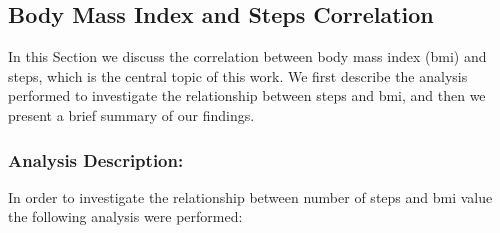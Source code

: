 \documentclass[11pt]{iopart}
\begin{document}
\subsection{Body Mass Index and Steps Correlation}
In this Section we discuss the correlation between body mass index (bmi) and steps, which is the central topic of this work. 
We first describe the analysis performed to investigate the relationship between steps and bmi, and then we present a brief summary of our findings.

 \subsubsection{Analysis Description:}

In order to investigate the relationship between number of steps and bmi value the following analysis were performed:
\end{document}
